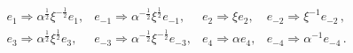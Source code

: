 \begin{equation}
\begin{array}{cccc}
e_{1}\Rightarrow \alpha ^{\frac{1}{2}}\xi ^{-\frac{1}{2}}e_{1}, &
e_{-1}\Rightarrow \alpha ^{-\frac{1}{2}}\xi ^{\frac{1}{2}}e_{-1},
& e_{2}\Rightarrow \xi e_{2}, &
e_{-2} \Rightarrow \xi ^{-1}  e_{-2} \, ,%
\\
e_{3}\Rightarrow \alpha ^{\frac{1}{2}}\xi ^{\frac{1}{2}}e_{3}, &
e_{-3}\Rightarrow \alpha ^{-\frac{1}{2}}\xi ^{-\frac{1}{2}}e_{-3},
& e_{4}\Rightarrow \alpha e_{4}, & e_{-4}\Rightarrow \alpha
^{-1}e_{-4}\, .
\end{array}
\label{llm2.14}
\end{equation}%
